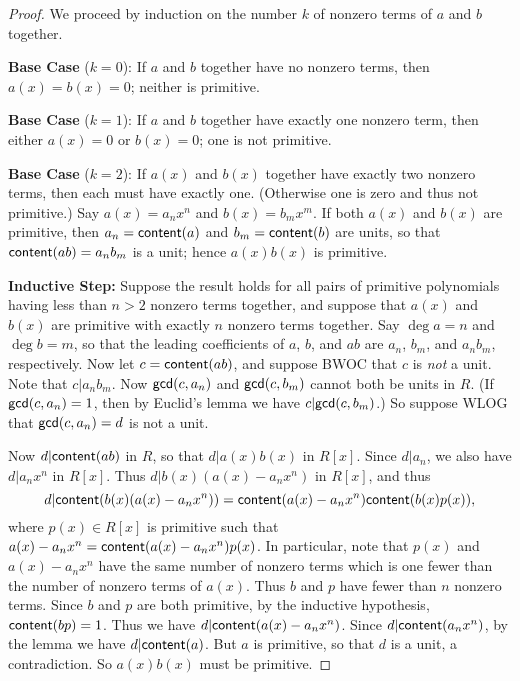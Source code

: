 \begin{proof}
We proceed by induction on the number \(k\) of nonzero terms of \(a\) and \(b\) together.

\textbf{Base Case} (\(k = 0\)): If \(a\) and \(b\) together have no nonzero terms, then \(a(x) = b(x) = 0\); neither is primitive.

\textbf{Base Case} (\(k = 1\)): If \(a\) and \(b\) together have exactly one nonzero term, then either \(a(x) = 0\) or \(b(x) = 0\); one is not primitive.

\textbf{Base Case} (\(k = 2\)): If \(a(x)\) and \(b(x)\) together have exactly two nonzero terms, then each must have exactly one.
(Otherwise one is zero and thus not primitive.)
Say \(a(x) = a_n x^n\) and \(b(x) = b_m x^m\).
If both \(a(x)\) and \(b(x)\) are primitive, then \(a_n = \mathsf{content}(a)\) and \(b_m = \mathsf{content}(b)\) are units, so that \(\mathsf{content}(ab) = a_nb_m\) is a unit; hence \(a(x)b(x)\) is primitive.

\textbf{Inductive Step:} Suppose the result holds for all pairs of primitive polynomials having less than \(n > 2\) nonzero terms together, and suppose that \(a(x)\) and \(b(x)\) are primitive with exactly \(n\) nonzero terms together.
Say \(\deg{a} = n\) and \(\deg{b} = m\), so that the leading coefficients of \(a\), \(b\), and \(ab\) are \(a_n\), \(b_m\), and \(a_nb_m\), respectively.
Now let \(c = \mathsf{content}(ab)\), and suppose BWOC that \(c\) is \emph{not} a unit.
Note that \(c|a_nb_m\).
Now \(\mathsf{gcd}(c, a_n)\) and \(\mathsf{gcd}(c, b_m)\) cannot both be units in \(R\).
(If \(\mathsf{gcd}(c, a_n) = 1\), then by Euclid's lemma we have \(c | \mathsf{gcd}(c, b_m)\).) So suppose WLOG that \(\mathsf{gcd}(c, a_n) = d\) is not a unit.

Now \(d|\mathsf{content}(ab)\) in \(R\), so that \(d|a(x)b(x)\) in \(R[x]\).
Since \(d|a_n\), we also have \(d|a_nx^n\) in \(R[x]\).
Thus \(d|b(x)(a(x) - a_nx^n)\) in \(R[x]\), and thus \[ d | \mathsf{content}(b(x)(a(x) - a_nx^n)) = \mathsf{content}(a(x) - a_nx^n)\mathsf{content}(b(x)p(x)), \] where \(p(x) \in R[x]\) is primitive such that \(a(x) - a_nx^n = \mathsf{content}(a(x) - a_nx^n)p(x)\).
In particular, note that \(p(x)\) and \(a(x) - a_nx^n\) have the same number of nonzero terms which is one fewer than the number of nonzero terms of \(a(x)\).
Thus \(b\) and \(p\) have fewer than \(n\) nonzero terms.
Since \(b\) and \(p\) are both primitive, by the inductive hypothesis, \(\mathsf{content}(bp) = 1\).
Thus we have \(d|\mathsf{content}(a(x) - a_nx^n)\).
Since \(d|\mathsf{content}(a_nx^n)\), by the lemma we have \(d|\mathsf{content}(a)\).
But \(a\) is primitive, so that \(d\) is a unit, a contradiction.
So \(a(x)b(x)\) must be primitive.
\end{proof}

